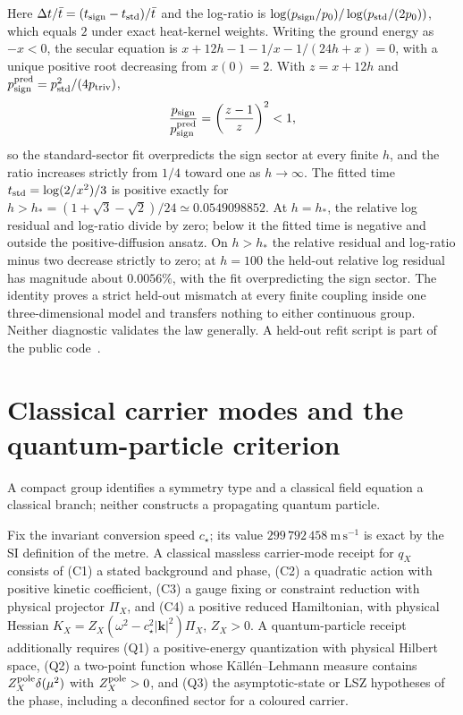 \documentclass[11pt]{article}
\begin{document}
Here \(\Delta t/\bar t=(t_{\rm sign}-t_{\rm std})/\bar t\) and the log-ratio is
\(\log(p_{\rm sign}/p_0)/\log(p_{\rm std}/(2p_0))\), which equals \(2\) under exact
heat-kernel weights. Writing the ground energy as \(-x<0\), the secular
equation is \(x+12h-1-1/x-1/(24h+x)=0\), with a unique positive root
decreasing from \(x(0)=2\). With \(z=x+12h\) and
\(p^{\rm pred}_{\rm sign}=p_{\rm std}^2/(4p_{\rm triv})\),
\[
\frac{p_{\rm sign}}{p_{\rm sign}^{\rm pred}}=\left(\frac{z-1}{z}\right)^2<1 ,
\]
so the standard-sector fit overpredicts the sign sector at every finite \(h\),
and the ratio increases strictly from \(1/4\) toward one as \(h\to\infty\). The
fitted time \(t_{\rm std}=\log(2/x^2)/3\) is positive exactly for
\(h>h_*=(1+\sqrt3-\sqrt2)/24\simeq0.0549098852\). At \(h=h_*\), the relative
log residual and log-ratio divide by zero; below it the fitted time is
negative and outside the positive-diffusion ansatz. On \(h>h_*\) the relative
residual and log-ratio minus two decrease strictly to zero; at \(h=100\) the
held-out relative log residual has magnitude about \(0.0056\%\), with the fit
overpredicting the sign sector. The identity proves a strict held-out
mismatch at every finite coupling inside one three-dimensional model and
transfers nothing to either continuous group. Neither diagnostic validates
the law generally. A held-out refit script is part of the public
code~\cite{ophrepo}.

\section{Classical carrier modes and the quantum-particle criterion}
\label{sec:particle-criterion}

A compact group identifies a symmetry type and a classical field equation a
classical branch; neither constructs a propagating quantum particle.

\begin{definition}
Fix the invariant conversion speed \(c_\star\); its value
\(299\,792\,458\ \mathrm{m\,s^{-1}}\) is exact by the SI definition of the metre.
A classical massless carrier-mode receipt for \(q_X\) consists of (C1) a stated
background and phase, (C2) a quadratic action with positive kinetic
coefficient, (C3) a gauge fixing or constraint reduction with physical
projector \(\Pi_X\), and (C4) a positive reduced Hamiltonian, with physical
Hessian \(K_X=Z_X(\omega^2-c_\star^2|\mathbf k|^2)\Pi_X\), \(Z_X>0\). A
quantum-particle receipt additionally requires (Q1) a positive-energy
quantization with physical Hilbert space, (Q2) a two-point function whose
K\"all\'en--Lehmann measure contains \(Z^{\rm pole}_X\delta(\mu^2)\) with
\(Z^{\rm pole}_X>0\), and (Q3) the asymptotic-state or LSZ hypotheses of the
phase, including a deconfined sector for a coloured carrier.
\end{definition}
\end{document}
